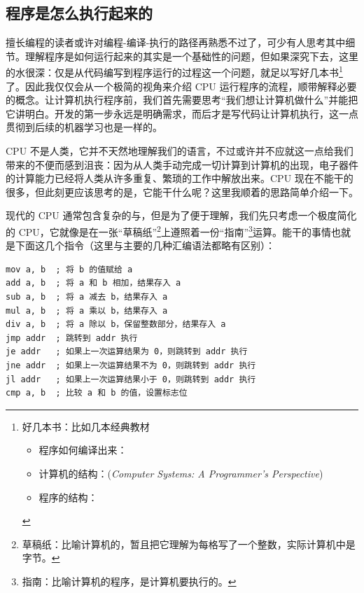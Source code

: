 \newpage

\subsection{程序是怎么执行起来的}

擅长编程的读者或许对编程-编译-执行的路径再熟悉不过了，可少有人思考其中细节。理解程序是如何运行起来的其实是一个基础性的问题，但如果深究下去，这里的水很深：仅是从代码编写到程序运行的过程这一个问题，就足以写好几本书\footnote{好几本书：比如几本经典教材
    \begin{itemize}
        \item 程序如何编译出来：
        \item 计算机的结构：(\emph{Computer Systems: A Programmer's Perspective})
        \item 程序的结构：
    \end{itemize}
}了。因此我仅仅会从一个极简的视角来介绍 CPU 运行程序的流程，顺带解释必要的概念。让计算机执行程序前，我们首先需要思考“我们想让计算机做什么”并能把它讲明白。开发的第一步永远是明确需求，而后才是写代码让计算机执行，这一点贯彻到后续的机器学习也是一样的。

CPU 不是人类，它并不天然地理解我们的语言，不过或许并不应就这一点给我们带来的不便而感到沮丧：因为从人类手动完成一切计算到计算机的出现，电子器件的计算能力已经将人类从许多重复、繁琐的工作中解放出来。CPU 现在不能干的很多，但此刻更应该思考的是，它能干什么呢？这里我顺着的思路简单介绍一下。

现代的 CPU 通常包含复杂的与，但是为了便于理解，我们先只考虑一个极度简化的 CPU，它就像是在一张“草稿纸”\footnote{草稿纸：比喻计算机的，暂且把它理解为每格写了一个整数，实际计算机中是字节。}上遵照着一份“指南”\footnote{指南：比喻计算机的程序，是计算机要执行的。}运算。能干的事情也就是下面这几个指令（这里与主要的几种汇编语法都略有区别）：
\begin{verbatim}
mov a, b  ; 将 b 的值赋给 a
add a, b  ; 将 a 和 b 相加，结果存入 a
sub a, b  ; 将 a 减去 b，结果存入 a
mul a, b  ; 将 a 乘以 b，结果存入 a
div a, b  ; 将 a 除以 b，保留整数部分，结果存入 a
jmp addr  ; 跳转到 addr 执行
je addr   ; 如果上一次运算结果为 0，则跳转到 addr 执行
jne addr  ; 如果上一次运算结果不为 0，则跳转到 addr 执行
jl addr   ; 如果上一次运算结果小于 0，则跳转到 addr 执行
cmp a, b  ; 比较 a 和 b 的值，设置标志位
\end{verbatim}

